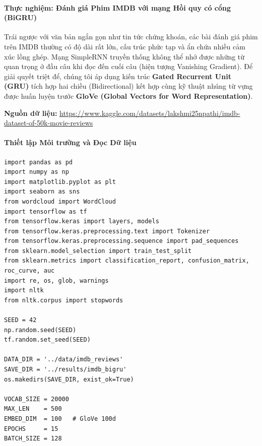 \paragraph{Thực nghiệm: Đánh giá Phim IMDB với mạng Hồi quy có cổng (BiGRU)} \hfill\mbox{}

Trái ngược với văn bản ngắn gọn như tin tức chứng khoán, các bài đánh giá phim trên IMDB thường có độ dài rất lớn, cấu trúc phức tạp và ẩn chứa nhiều cảm xúc lồng ghép. Mạng SimpleRNN truyền thống không thể nhớ được những từ quan trọng ở đầu câu khi đọc đến cuối câu (hiện tượng Vanishing Gradient). Để giải quyết triệt để, chúng tôi áp dụng kiến trúc \textbf{Gated Recurrent Unit (GRU)} tích hợp hai chiều (Bidirectional) kết hợp cùng kỹ thuật nhúng từ vựng được huấn luyện trước \textbf{GloVe (Global Vectors for Word Representation)}.

\begin{center}
    \textbf{Nguồn dữ liệu:} \url{https://www.kaggle.com/datasets/lakshmi25npathi/imdb-dataset-of-50k-movie-reviews}
\end{center}

\paragraph{Thiết lập Môi trường và Đọc Dữ liệu} \hfill\mbox{}

\begin{lstlisting}[style=pythoncode, caption={Khởi tạo môi trường thư viện cho cấu trúc GRU}]
import pandas as pd
import numpy as np
import matplotlib.pyplot as plt
import seaborn as sns
from wordcloud import WordCloud
import tensorflow as tf
from tensorflow.keras import layers, models
from tensorflow.keras.preprocessing.text import Tokenizer
from tensorflow.keras.preprocessing.sequence import pad_sequences
from sklearn.model_selection import train_test_split
from sklearn.metrics import classification_report, confusion_matrix, roc_curve, auc
import re, os, glob, warnings
import nltk
from nltk.corpus import stopwords

SEED = 42
np.random.seed(SEED)
tf.random.set_seed(SEED)

DATA_DIR = '../data/imdb_reviews'
SAVE_DIR = '../results/imdb_bigru'
os.makedirs(SAVE_DIR, exist_ok=True)

VOCAB_SIZE = 20000
MAX_LEN    = 500
EMBED_DIM  = 100   # GloVe 100d
EPOCHS     = 15
BATCH_SIZE = 128
\end{lstlisting}

